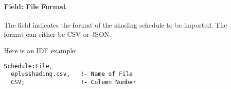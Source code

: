 \paragraph{Field: File Format}\label{field-file-format}

The field indicates the format of the shading schedule to be imported. The format can either be CSV or JSON.

Here is an IDF example:

\begin{lstlisting}
Schedule:File,
  eplusshading.csv,   !- Name of File
  CSV;                !- Column Number
\end{lstlisting}